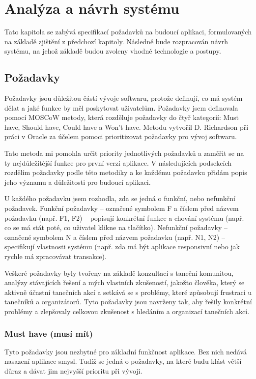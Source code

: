\chapter{Analýza a návrh systému}
\begin{chapterabstract}
    Tato kapitola se zabývá specifikací požadavků na budoucí aplikaci, formulovaných na základě zjištění z předchozí kapitoly. Následně bude rozpracován návrh systému, na jehož základě budou zvoleny vhodné technologie a postupy.
\end{chapterabstract}

\section{Požadavky}
Požadavky jsou důležitou částí vývoje softwaru, protože definují, co má systém dělat a jaké funkce by měl poskytovat uživatelům. Požadavky jsem definovala pomocí MOSCoW metody, která rozděluje požadavky do čtyř kategorií: Must have, Should have, Could have a Won't have. Metodu vytvořil D. Richardson při práci v Oracle za účelem pomoci prioritizovat požadavky pro vývoj softwaru.\cite{moscow:definition}

Tato metoda mi pomohla určit priority jednotlivých požadavků a zaměřit se na ty nejdůležitější funkce pro první verzi aplikace. V následujících podsekcích rozdělím požadavky podle této metodiky a ke každému požadavku přidám popis jeho významu a důležitosti pro budoucí aplikaci.

U každého požadavku jsem rozhodla, zda se jedná o funkční, nebo nefunkční požadavek. Funkční požadavky – označené symbolem F a číslem před názvem požadavku (např. F1, F2) – popisují konkrétní funkce a chování systému (např. co se má stát poté, co uživatel klikne na tlačítko). Nefunkční požadavky – označené symbolem N a číslem před názvem požadavku (např. N1, N2) – specifikují vlastnosti systému (např. zda má být aplikace responsivní nebo jak rychle má zpracovávat transakce). \cite{nonFunctionalVsFunctional:definition}

Veškeré požadavky byly tvořeny na základě konzultací s taneční komunitou, analýzy stávajících řešení a mých vlastních zkušeností, jakožto člověka, který se aktivně účastní tanečních akcí a setkává se s problémy, které způsobují frustraci u tanečníků a organizátorů. Tyto požadavky jsou navrženy tak, aby řešily konkrétní problémy a zlepšovaly celkovou zkušenost s hledáním a organizací tanečních akcí.

\subsection{Must have (musí mít)}
Tyto požadavky jsou nezbytné pro základní funkčnost aplikace. Bez nich nedává nasazení aplikace smysl. Tudíž se jedná o požadavky, na které budu klást větší důraz a dávat jim nejvyšší prioritu při vývoji. \cite{moscow:definition}
